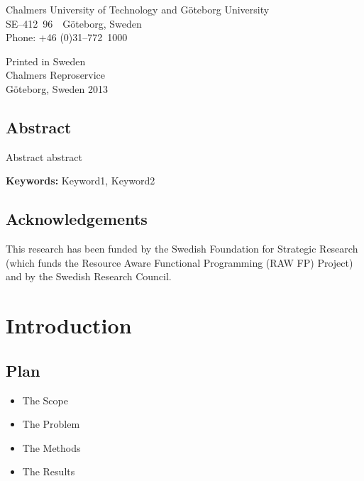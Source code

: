 \documentclass[a4paper]{book}
\newcommand{\uni}{Chalmers University of Technology and G\"oteborg University}
\begin{document}
\vspace{1cm} 

\noindent \uni \\
\noindent SE--412~96~~G\"oteborg, Sweden\\
\noindent Phone: +46 (0)31--772~1000 \\

\vspace{1cm} 

\noindent Printed in Sweden\\
\noindent Chalmers Reproservice\\
\noindent G\"oteborg, Sweden 2013


\thispagestyle{empty}

\clearpage
{}

\section*{Abstract}
Abstract abstract 

\vspace{5mm}

\noindent

 \textbf{Keywords:} Keyword1, Keyword2  

\clearpage

\section*{Acknowledgements}


\vspace{5mm}
This research has been funded by the Swedish Foundation for
Strategic Research (which funds the Resource Aware Functional 
Programming (RAW FP) Project) and by the Swedish Research Council.


\tableofcontents


\cleardoublepage

\pagestyle{fancy}
\fancyfoot{}
\fancyhead[LO]{}
\fancyhead[RO]{\leftmark}
\renewcommand{\headrulewidth}{0.0pt}
\fancyhead[LE,RO]{\thepage}

\chapter{Introduction}

\section{Plan} 
\begin{itemize} 
  \item The Scope
  \item The Problem 
  \item The Methods
  \item The Results 
\end{itemize}
\end{document}
